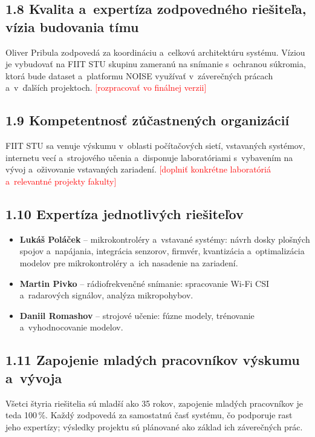 \documentclass[11pt,a4paper]{article}
\newcommand{\doplnit}[1]{\textcolor{red}{[#1]}}
\begin{document}
\subsection*{1.8 Kvalita a~expertíza zodpovedného riešiteľa, vízia budovania tímu}
Oliver Pribula zodpovedá za koordináciu a~celkovú architektúru systému. Víziou je vybudovať na FIIT STU skupinu zameranú na snímanie s~ochranou súkromia, ktorá bude dataset a~platformu NOISE využívať v~záverečných prácach a~v~ďalších projektoch. \doplnit{rozpracovať vo finálnej verzii}

\subsection*{1.9 Kompetentnosť zúčastnených organizácií}
FIIT STU sa venuje výskumu v~oblasti počítačových sietí, vstavaných systémov, internetu vecí a~strojového učenia a~disponuje laboratóriami s~vybavením na vývoj a~oživovanie vstavaných zariadení. \doplnit{doplniť konkrétne laboratóriá a~relevantné projekty fakulty}

\subsection*{1.10 Expertíza jednotlivých riešiteľov}
\begin{itemize}
\item \textbf{Lukáš Poláček} -- mikrokontroléry a~vstavané systémy: návrh dosky plošných spojov a~napájania, integrácia senzorov, firmvér, kvantizácia a~optimalizácia modelov pre mikrokontroléry a~ich nasadenie na zariadení.
\item \textbf{Martin Pivko} -- rádiofrekvenčné snímanie: spracovanie Wi-Fi CSI a~radarových signálov, analýza mikropohybov.
\item \textbf{Daniil Romashov} -- strojové učenie: fúzne modely, trénovanie a~vyhodnocovanie modelov.
\end{itemize}

\subsection*{1.11 Zapojenie mladých pracovníkov výskumu a~vývoja}
Všetci štyria riešitelia sú mladší ako 35 rokov, zapojenie mladých pracovníkov je teda 100\,\%. Každý zodpovedá za samostatnú časť systému, čo podporuje rast jeho expertízy; výsledky projektu sú plánované ako základ ich záverečných prác.

\end{document}
